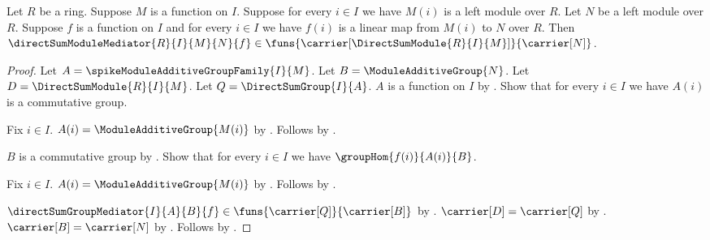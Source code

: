 \begin{proposition}\label{spike_direct_sum_module_mediator_type}
    Let $R$ be a ring.
    Suppose $M$ is a function on $I$.
    Suppose for every $i\in I$ we have $M(i)$ is a left module over $R$.
    Let $N$ be a left module over $R$.
    Suppose $f$ is a function on $I$ and for every $i\in I$ we have
        $f(i)$ is a linear map from $M(i)$ to $N$ over $R$.
    Then
        $\directSumModuleMediator{R}{I}{M}{N}{f}\in
            \funs{\carrier[\DirectSumModule{R}{I}{M}]}{
                \carrier[N]}$.
\end{proposition}
\begin{proof}
    Let $A=\spikeModuleAdditiveGroupFamily{I}{M}$.
    Let $B=\ModuleAdditiveGroup{N}$.
    Let $D=\DirectSumModule{R}{I}{M}$.
    Let $Q=\DirectSumGroup{I}{A}$.
    $A$ is a function on $I$ by
        .
    Show that for every $i\in I$ we have $A(i)$ is a commutative group.
    \begin{subproof}
        Fix $i\in I$.
        $A(i)=\ModuleAdditiveGroup{M(i)}$ by
            .
        Follows by .
    \end{subproof}
    $B$ is a commutative group by
        .
    Show that for every $i\in I$ we have $\groupHom{f(i)}{A(i)}{B}$.
    \begin{subproof}
        Fix $i\in I$.
        $A(i)=\ModuleAdditiveGroup{M(i)}$ by
            .
        Follows by .
    \end{subproof}
    $\directSumGroupMediator{I}{A}{B}{f}\in
        \funs{\carrier[Q]}{\carrier[B]}$ by
        .
    $\carrier[D]=\carrier[Q]$ by
        .
    $\carrier[B]=\carrier[N]$ by
        .
    Follows by .
\end{proof}


